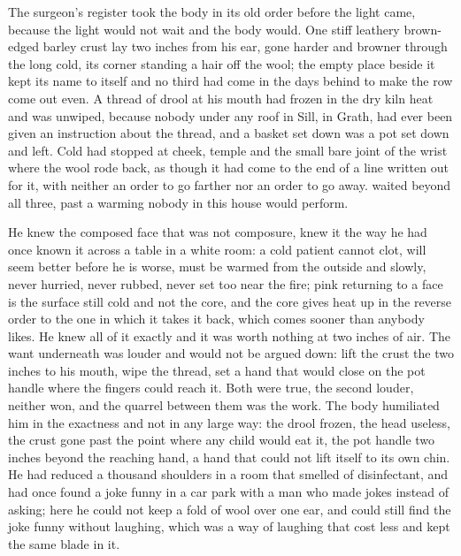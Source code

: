 \scenebreak

The surgeon's register took the body in its old order before the light came, because the light would not wait and the body would. One stiff leathery brown-edged barley crust lay two inches from his ear, gone harder and browner through the long cold, its corner standing a hair off the wool; the empty place beside it kept its name to itself and no third had come in the days behind to make the row come out even. A thread of drool at his mouth had frozen in the dry kiln heat and was unwiped, because nobody under any roof in Sill, in Grath, had ever been given an instruction about the thread, and a basket set down was a pot set down and left. Cold had stopped at cheek, temple and the small bare joint of the wrist where the wool rode back, as though it had come to the end of a line written out for it, with neither an order to go farther nor an order to go away.  waited beyond all three, past a warming nobody in this house would perform.

He knew the composed face that was not composure, knew it the way he had once known it across a table in a white room: a cold patient cannot clot, will seem better before he is worse, must be warmed from the outside and slowly, never hurried, never rubbed, never set too near the fire; pink returning to a face is the surface still cold and not the core, and the core gives heat up in the reverse order to the one in which it takes it back, which comes sooner than anybody likes. He knew all of it exactly and it was worth nothing at two inches of air. The want underneath was louder and would not be argued down: lift the crust the two inches to his mouth, wipe the thread, set a hand that would close on the pot handle where the fingers could reach it. Both were true, the second louder, neither won, and the quarrel between them was the work. The body humiliated him in the exactness and not in any large way: the drool frozen, the head useless, the crust gone past the point where any child would eat it, the pot handle two inches beyond the reaching hand, a hand that could not lift itself to its own chin. He had reduced a thousand shoulders in a room that smelled of disinfectant, and had once found a joke funny in a car park with a man who made jokes instead of asking; here he could not keep a fold of wool over one ear, and could still find the joke funny without laughing, which was a way of laughing that cost less and kept the same blade in it.

